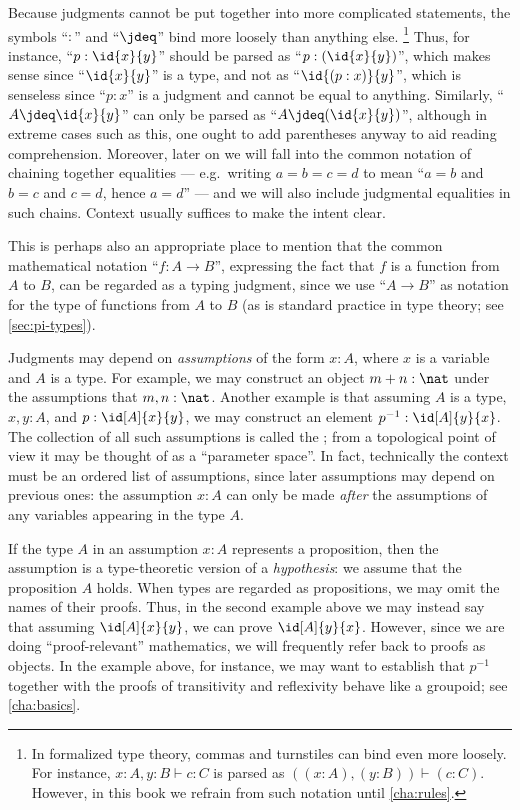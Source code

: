 Because judgments cannot be put together into more complicated statements, the symbols ``$:$'' and ``$\jdeq$'' bind more loosely than anything else.%
\footnote{In formalized type theory, commas and turnstiles can bind even more loosely.
  For instance, $x:A,y:B\vdash c:C$ is parsed as $((x:A),(y:B))\vdash (c:C)$.
  However, in this book we refrain from such notation until \cref{cha:rules}.}
Thus, for instance, ``$p:\id{x}{y}$'' should be parsed as ``$p:(\id{x}{y})$'', which makes sense since ``$\id{x}{y}$'' is a type, and not as ``$\id{(p:x)}{y}$'', which is senseless since ``$p:x$'' is a judgment and cannot be equal to anything.
Similarly, ``$A\jdeq \id{x}{y}$'' can only be parsed as ``$A\jdeq(\id{x}{y})$'', although in extreme cases such as this, one ought to add parentheses anyway to aid reading comprehension.
Moreover, later on we will fall into the common notation of chaining together equalities --- e.g.\ writing $a=b=c=d$ to mean ``$a=b$ and $b=c$ and $c=d$, hence $a=d$'' --- and we will also include judgmental equalities in such chains.
Context usually suffices to make the intent clear.

This is perhaps also an appropriate place to mention that the common mathematical notation ``$f:A\to B$'', expressing the fact that $f$ is a function from $A$ to $B$, can be regarded as a typing judgment, since we use ``$A\to B$'' as notation for the type of functions from $A$ to $B$ (as is standard practice in type theory; see \cref{sec:pi-types}).

%
Judgments may depend on \emph{assumptions} of the form $x:A$, where $x$ is a variable
%
and $A$ is a type.
For example, we may construct an object $m + n : \nat$ under the assumptions that $m,n : \nat$.
Another example is that assuming $A$ is a type, $x,y : A$, and $p : \id[A]{x}{y}$, we may construct an element $p^{-1} : \id[A]{y}{x}$.
The collection of all such assumptions is called the ;%
from a topological point of view it may be thought of as a ``parameter space''.
In fact, technically the context must be an ordered list of assumptions, since later assumptions may depend on previous ones: the assumption $x:A$ can only be made \emph{after} the assumptions of any variables appearing in the type $A$.

If the type $A$ in an assumption $x:A$ represents a proposition, then the assumption is a type-theoretic version of a \emph{hypothesis}:
%
we assume that the proposition $A$ holds.
When types are regarded as propositions, we may omit the names of their proofs.
Thus, in the second example above we may instead say that assuming $\id[A]{x}{y}$, we can prove $\id[A]{y}{x}$.
However, since we are doing ``proof-relevant'' mathematics,
%
we will frequently refer back to proofs as objects.
In the example above, for instance, we may want to establish that $p^{-1}$ together with the proofs of transitivity and reflexivity behave like a groupoid; see \cref{cha:basics}.

